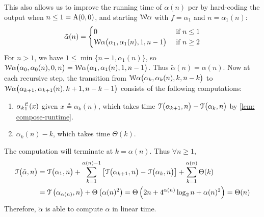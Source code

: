 This also allows us to improve the running time of $\alpha(n)$ per  by hard-coding the output when $n\le 1 = \text{A}(0, 0)$, and starting $\mathcal{W}\alpha$ with $f = \alpha_1$ and $n = \alpha_1(n)$:
\begin{equation*}
\tilde{\alpha}(n) = \begin{cases}
0 & \text{ if } n \le 1 \\ \mathcal{W}\alpha\big(\alpha_1, \alpha_1(n), 1, n-1\big) & \text{ if } n \ge 2
\end{cases}
\end{equation*}
For $n > 1$, we have $1\le \min\big\{n-1, \alpha_1(n)\big\}$, so $
\mathcal{W}\alpha\big(\alpha_0, \alpha_0(n), 0, n\big) =
\mathcal{W}\alpha\big(\alpha_1, \alpha_1(n), 1, n-1\big)$.
Thus $\tilde{\alpha}(n) = \alpha(n)$. Now at each recursive step, the transition from $\mathcal{W}\alpha\big(\alpha_k, \alpha_k(n), k, n-k\big)$ to $\mathcal{W}\alpha\big(\alpha_{k+1}, \alpha_{k+1}(n), k+1, n-k-1\big)$ consists of the following computations:
 \begin{enumerate}[label={(\arabic*)}]
	\item $\cdt{\alpha_k}{1}(x)$ given $x\triangleq \alpha_k(n)$, which takes time $\mathcal{T}\big(\alpha_{k+1}, n\big) - \mathcal{T}\big(\alpha_k, n\big)$ by \cref{lem: compose-runtime}.
	\item $\alpha_k(n) - k$, which takes time $\Theta(k)$.
\end{enumerate}
The computation will terminate at $k = \alpha(n)$. Thus $\forall n\ge 1$,
\begin{equation} \label{eq: inv-ack-runtime-improved}
\begin{aligned}
\mathcal{T}\big(\tilde{\alpha}, n\big) & = \mathcal{T}\big(\alpha_1, n\big) + \sum_{k=1}^{\alpha(n) - 1}
\left[ \mathcal{T}\big(\alpha_{k+1}, n\big) - \mathcal{T}\big(\alpha_k, n\big)
\right] + \sum_{k=1}^{\alpha(n)}\Theta(k) \\
& = \mathcal{T}\left(\alpha_{\alpha(n)}, n\right) + \Theta\left(\alpha(n)^2\right)
= \Theta\left(2n + 4^{\alpha(n)}\log_2n + \alpha(n)^2\right) = \Theta(n)
\end{aligned}
\end{equation}
Therefore, $\tilde{\alpha}$ is able to compute $\alpha$ in linear time.
